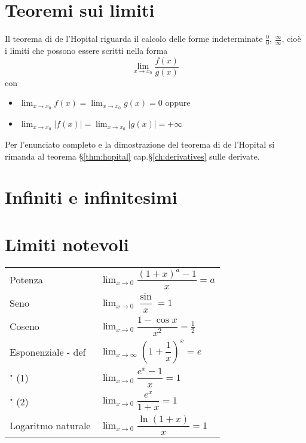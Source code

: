 \section{Teoremi sui limiti}
\begin{theorem}\label{thm:comparison}
\end{theorem}

\begin{theorem}\label{thm:hopital:0} Il teorema di de l'Hopital riguarda il calcolo delle forme indeterminate $\frac{0}{0}$, $\frac{\infty}{\infty}$, cioè i limiti che possono essere scritti nella forma
    \begin{equation}
        \lim_{x \rightarrow x_0} \dfrac{f(x)}{g(x)}
    \end{equation}
    con
    \begin{itemize}
        \item $\lim_{x \rightarrow x_0} f(x) = \lim_{x \rightarrow x_0} g(x) = 0$ oppure
        \item $\lim_{x \rightarrow x_0} |f(x)| = \lim_{x \rightarrow x_0} |g(x)| = +\infty$
    \end{itemize}
\end{theorem}
    Per l'enunciato completo e la dimostrazione del teorema di de l'Hopital si rimanda al teorema \S\ref{thm:hopital} cap.\S\ref{ch:derivatives} sulle derivate.

\section{Infiniti e infinitesimi}

\section{Limiti notevoli}
\begin{center}
\begin{tabular}{ll}
    Potenza            & $\displaystyle\lim_{x \rightarrow 0} \dfrac{(1+x)^a - 1}{x} = a$ \\
    Seno               & $\displaystyle\lim_{x \rightarrow 0} \dfrac{\sin}{x} = 1$ \\
    Coseno             & $\displaystyle\lim_{x \rightarrow 0} \dfrac{1 - \cos x}{x^2} = \frac{1}{2}$ \\
    Esponenziale - def & $\displaystyle\lim_{x \rightarrow \infty} \left( 1 + \dfrac{1}{x} \right)^x = e$ \\
    \qquad " \qquad (1)& $\displaystyle\lim_{x \rightarrow 0} \dfrac{e^x - 1}{x} = 1$ \\
    \qquad " \qquad (2)& $\displaystyle\lim_{x \rightarrow 0} \dfrac{e^{x}}{1+x} = 1$ \\
    Logaritmo naturale & $\displaystyle\lim_{x \rightarrow 0} \dfrac{\ln (1+x)}{x} = 1$ \\
\end{tabular}
\end{center}

